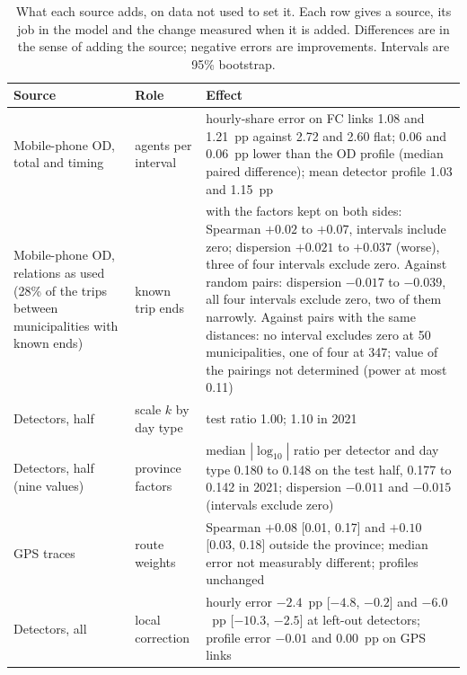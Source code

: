 \documentclass[11pt,a4paper]{article}
\begin{document}
\begin{table}[htbp]
\centering
\caption{What each source adds, on data not used to set it. Each row gives a source, its job in the model and the change measured when it is added. Differences are in the sense of adding the source; negative errors are improvements. Intervals are 95\% bootstrap.}
\label{tab:sources}
\begin{tabularx}{\textwidth}{@{}p{4.2cm}p{3.6cm}X@{}}
\toprule
Source & Role & Effect \\
\midrule
Mobile-phone OD, total and timing & agents per interval & hourly-share error on FC links 1.08 and 1.21~pp against 2.72 and 2.60 flat; 0.06 and 0.06~pp lower than the OD profile (median paired difference); mean detector profile 1.03 and 1.15~pp \\
Mobile-phone OD, relations as used (28\% of the trips between municipalities with known ends) & known trip ends & with the factors kept on both sides: Spearman $+0.02$ to $+0.07$, intervals include zero; dispersion $+0.021$ to $+0.037$ (worse), three of four intervals exclude zero. Against random pairs: dispersion $-0.017$ to $-0.039$, all four intervals exclude zero, two of them narrowly. Against pairs with the same distances: no interval excludes zero at 50 municipalities, one of four at 347; value of the pairings not determined (power at most 0.11) \\
Detectors, half & scale $k$ by day type & test ratio 1.00; 1.10 in 2021 \\
Detectors, half (nine values) & province factors & median $|\log_{10}|$ ratio per detector and day type 0.180 to 0.148 on the test half, 0.177 to 0.142 in 2021; dispersion $-0.011$ and $-0.015$ (intervals exclude zero) \\
GPS traces & route weights & Spearman $+0.08$ [0.01, 0.17] and $+0.10$ [0.03, 0.18] outside the province; median error not measurably different; profiles unchanged \\
Detectors, all & local correction & hourly error $-2.4$~pp [$-4.8$, $-0.2$] and $-6.0$~pp [$-10.3$, $-2.5$] at left-out detectors; profile error $-0.01$ and $0.00$~pp on GPS links \\
\bottomrule
\end{tabularx}
\end{table}


\end{document}

